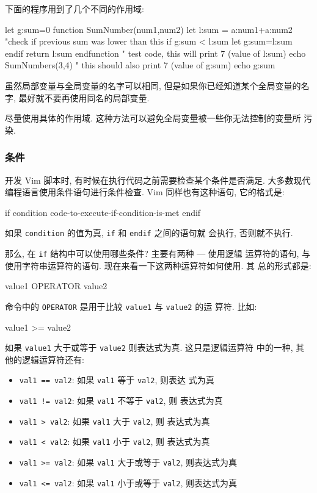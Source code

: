 下面的程序用到了几个不同的作用域:
\begin{vimcode}
let g:sum=0
function SumNumber(num1,num2)
    let l:sum = a:num1+a:num2
    "check if previous sum was lower than this
    if g:sum < l:sum
        let g:sum=l:sum
    endif
    return l:sum
endfunction
" test code, this will print 7 (value of l:sum)
echo SumNumbers(3,4)
" this should also print 7 (value of g:sum)
echo g:sum
\end{vimcode}

虽然局部变量与全局变量的名字可以相同, 但是如果你已经知道某个全局变量的名字,
最好就不要再使用同名的局部变量.

\begin{warning}
    尽量使用具体的作用域. 这种方法可以避免全局变量被一些你无法控制的变量所
    污染.
\end{warning}

\subsubsection{条件}
\label{subsubsec:conditions}

开发 Vim 脚本时, 有时候在执行代码之前需要检查某个条件是否满足. 大多数现代
编程语言使用条件语句进行条件检查. Vim 同样也有这种语句, 它的格式是:
\begin{vimcode}
if condition
    code-to-execute-if-condition-is-met
endif
\end{vimcode}
如果 \texttt{condition} 的值为真, \texttt{if} 和 \texttt{endif} 之间的语句就
会执行, 否则就不执行.

那么, 在 \texttt{if} 结构中可以使用哪些条件? 主要有两种 --- 使用逻辑
运算符的语句, 与使用字符串运算符的语句. 现在来看一下这两种运算符如何使用. 其
总的形式都是:
\begin{vimcode}
value1 OPERATOR value2
\end{vimcode}
命令中的 \texttt{OPERATOR} 是用于比较 \texttt{value1} 与 \texttt{value2} 的运
算符. 比如:
\begin{vimcode}
value1 >= value2
\end{vimcode}
如果 \texttt{value1} 大于或等于 \texttt{value2} 则表达式为真. 这只是逻辑运算符
中的一种, 其他的逻辑运算符还有:
\begin{itemize}
    \item \texttt{val1 == val2}: 如果 \texttt{val1} 等于 \texttt{val2}, 则表达
        式为真
    \item \texttt{val1 != val2}: 如果 \texttt{val1} 不等于 \texttt{val2}, 则
        表达式为真
    \item \texttt{val1 > val2}: 如果 \texttt{val1} 大于 \texttt{val2}, 则
        表达式为真
    \item \texttt{val1 < val2}: 如果 \texttt{val1} 小于 \texttt{val2}, 则
        表达式为真
    \item \texttt{val1 >= val2}: 如果 \texttt{val1} 大于或等于 \texttt{val2},
        则表达式为真
    \item \texttt{val1 <= val2}: 如果 \texttt{val1} 小于或等于 \texttt{val2},
        则表达式为真
\end{itemize}

